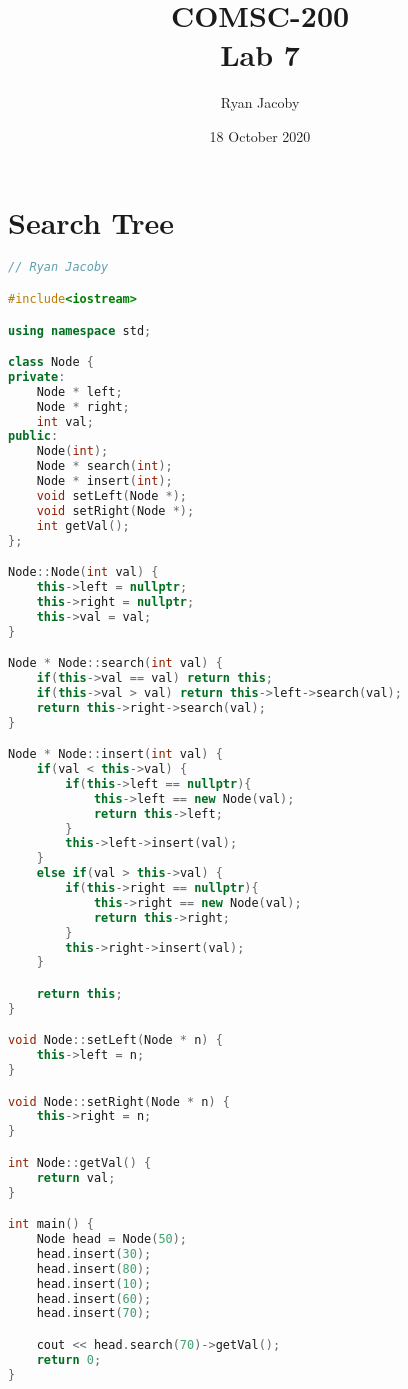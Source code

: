 \documentclass[letterpaper, 11pt]{article}
\title{COMSC-200 \\ Lab 7}
\author{Ryan Jacoby}
\date{18 October 2020}
\begin{document}
\maketitle

\section{Search Tree}

\begin{lstlisting}[language=c++, caption=main.cpp]
// Ryan Jacoby

#include<iostream>

using namespace std;

class Node {
private:
    Node * left;
    Node * right;
    int val;
public:
    Node(int);
    Node * search(int);
    Node * insert(int);
    void setLeft(Node *);
    void setRight(Node *);
    int getVal();
};

Node::Node(int val) {
    this->left = nullptr;
    this->right = nullptr;
    this->val = val;
}

Node * Node::search(int val) {
    if(this->val == val) return this;
    if(this->val > val) return this->left->search(val);
    return this->right->search(val);
}

Node * Node::insert(int val) {
    if(val < this->val) {
        if(this->left == nullptr){
            this->left == new Node(val);
            return this->left;
        }
        this->left->insert(val);
    }
    else if(val > this->val) {
        if(this->right == nullptr){
            this->right == new Node(val);
            return this->right;
        }
        this->right->insert(val);
    }

    return this;
}

void Node::setLeft(Node * n) {
    this->left = n;
}

void Node::setRight(Node * n) {
    this->right = n;
}

int Node::getVal() {
    return val;
}

int main() {
    Node head = Node(50);
    head.insert(30);
    head.insert(80);
    head.insert(10);
    head.insert(60);
    head.insert(70);

    cout << head.search(70)->getVal();
    return 0;
}
\end{lstlisting}
\end{document}
